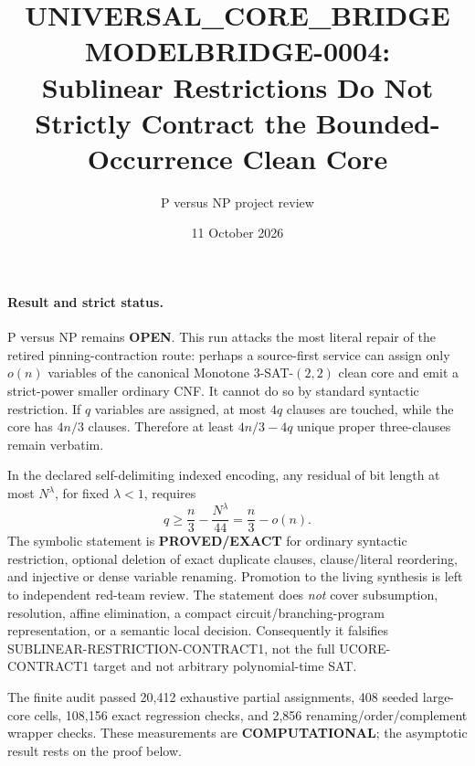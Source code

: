 \documentclass[11pt]{article}
\title{UNIVERSAL\_CORE\_BRIDGE MODELBRIDGE-0004:\\
Sublinear Restrictions Do Not Strictly Contract the Bounded-Occurrence Clean Core}
\author{P versus NP project review}
\date{11 October 2026}
\begin{document}
\maketitle

\paragraph{Result and strict status.}
P versus NP remains \textbf{OPEN}.  This run attacks the most literal repair
of the retired pinning-contraction route: perhaps a source-first service can
assign only $o(n)$ variables of the canonical Monotone
$3$-SAT-$(2,2)$ clean core and emit a strict-power smaller ordinary CNF.
It cannot do so by standard syntactic restriction.  If $q$ variables are
assigned, at most $4q$ clauses are touched, while the core has $4n/3$
clauses.  Therefore at least $4n/3-4q$ unique proper three-clauses remain
verbatim.

In the declared self-delimiting indexed encoding, any residual of bit length
at most $N^\lambda$, for fixed $\lambda<1$, requires
\[
 q\ge \frac n3-\frac{N^\lambda}{44}
   =\frac n3-o(n).
\]
The symbolic statement is \textbf{PROVED/EXACT} for ordinary syntactic
restriction, optional deletion of exact duplicate clauses, clause/literal
reordering, and injective or dense variable renaming.  Promotion to the
living synthesis is left to independent red-team review.  The statement
does \emph{not} cover subsumption, resolution, affine elimination, a compact
circuit/branching-program representation, or a semantic local decision.
Consequently it falsifies \textsf{SUBLINEAR-RESTRICTION-CONTRACT1}, not the
full \textsf{UCORE-CONTRACT1} target and not arbitrary polynomial-time SAT.

The finite audit passed 20,412 exhaustive partial assignments, 408 seeded
large-core cells, 108,156 exact regression checks, and 2,856
renaming/order/complement wrapper checks.  These measurements are
\textbf{COMPUTATIONAL}; the asymptotic result rests on the proof below.
\end{document}
